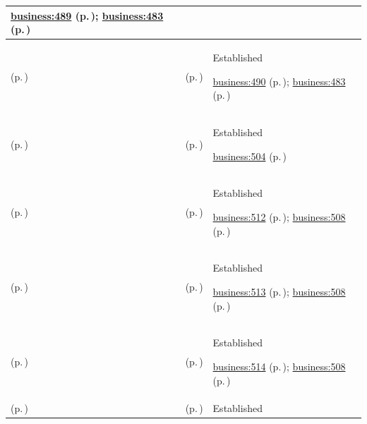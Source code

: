 \begin{longtable}{|>{\raggedright\arraybackslash}p{0.27\TableWidth}|>{\raggedright\arraybackslash}p{0.27\TableWidth}|>{\raggedright\arraybackslash}p{0.46\TableWidth}|}
 \hyperref[rad:business:485]{business:489} (p.\,\pageref{rad:business:485}); \hyperref[rad:business:483]{business:483} (p.\,\pageref{rad:business:483})\\\hline
\nameref{cap:bc-medication-pharmacy-services} (p.\,\pageref{cap:bc-medication-pharmacy-services}) & \nameref{cap:bc-medication-dose-administration-aid-provision} (p.\,\pageref{cap:bc-medication-dose-administration-aid-provision}) & Established

 \hyperref[rad:business:485]{business:490} (p.\,\pageref{rad:business:485}); \hyperref[rad:business:483]{business:483} (p.\,\pageref{rad:business:483})\\\hline
\nameref{cap:bc-health-products-clinical-technology} (p.\,\pageref{cap:bc-health-products-clinical-technology}) & \nameref{cap:bc-clinical-technology-management} (p.\,\pageref{cap:bc-clinical-technology-management}) & Established

 \hyperref[rad:business:504]{business:504} (p.\,\pageref{rad:business:504})\\\hline
\nameref{cap:bc-clinical-technology-management} (p.\,\pageref{cap:bc-clinical-technology-management}) & \nameref{cap:bc-clinical-device-inventory-management} (p.\,\pageref{cap:bc-clinical-device-inventory-management}) & Established

 \hyperref[rad:business:510]{business:512} (p.\,\pageref{rad:business:510}); \hyperref[rad:business:508]{business:508} (p.\,\pageref{rad:business:508})\\\hline
\nameref{cap:bc-clinical-technology-management} (p.\,\pageref{cap:bc-clinical-technology-management}) & \nameref{cap:bc-clinical-device-feature-release-management} (p.\,\pageref{cap:bc-clinical-device-feature-release-management}) & Established

 \hyperref[rad:business:510]{business:513} (p.\,\pageref{rad:business:510}); \hyperref[rad:business:508]{business:508} (p.\,\pageref{rad:business:508})\\\hline
\nameref{cap:bc-clinical-technology-management} (p.\,\pageref{cap:bc-clinical-technology-management}) & \nameref{cap:bc-clinical-device-loan-deployment-management} (p.\,\pageref{cap:bc-clinical-device-loan-deployment-management}) & Established

 \hyperref[rad:business:510]{business:514} (p.\,\pageref{rad:business:510}); \hyperref[rad:business:508]{business:508} (p.\,\pageref{rad:business:508})\\\hline
\nameref{cap:bc-clinical-technology-management} (p.\,\pageref{cap:bc-clinical-technology-management}) & \nameref{cap:bc-clinical-device-utilisation-support} (p.\,\pageref{cap:bc-clinical-device-utilisation-support}) & Established


\end{longtable}
